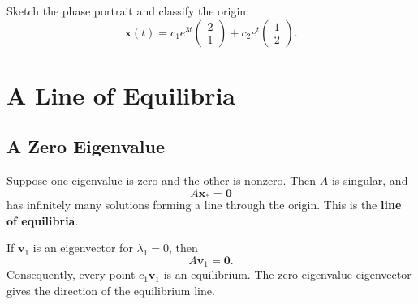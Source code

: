 \documentclass[10pt,letterpaper]{article}
\begin{document}
\begin{example}[3]{
Sketch the phase portrait and classify the origin:
\[
\mathbf{x}(t)
=c_1e^{3t}\begin{pmatrix}2\\1\end{pmatrix}
+c_2e^t\begin{pmatrix}1\\2\end{pmatrix}.
\]
}
\begin{center}
\end{center}
\end{example}

\section{A Line of Equilibria}

\subsection{A Zero Eigenvalue}

Suppose one eigenvalue is zero and the other is nonzero.
Then $A$ is singular, and
\[
A\mathbf{x}_*=\mathbf{0}
\]
has infinitely many solutions forming a line through
the origin. This is the \textbf{line of equilibria}.

If $\mathbf{v}_1$ is an eigenvector for $\lambda_1=0$,
then
\[
A\mathbf{v}_1=\mathbf{0}.
\]
Consequently, every point $c_1\mathbf{v}_1$ is an
equilibrium. The zero-eigenvalue eigenvector gives
the direction of the equilibrium line.
\end{document}
